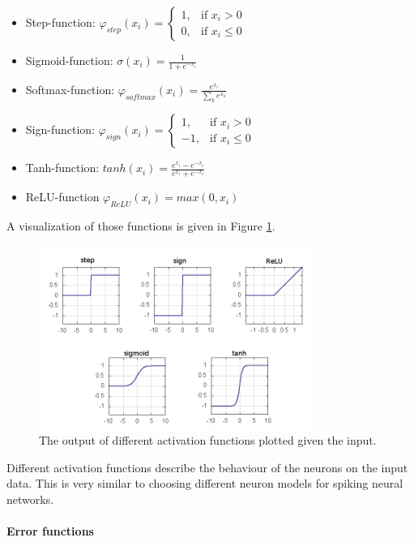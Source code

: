 \begin{itemize}
	\item Step-function: $\varphi_{step}(x_i) = \begin{cases} 1, & \text{if  } x_i > 0 \\ 0, & \text{if  } x_i \le 0  \end{cases}$
	\item Sigmoid-function: $\sigma(x_i) = \frac{1}{1 + e^{-x_i}}$ 
	\item Softmax-function: $\varphi_{softmax}(x_i) = \frac{e^{x_i}}{\sum_k e^{x_k}}$ 
	\item Sign-function: $\varphi_{sign}(x_i) = \begin{cases} 1, & \text{if  } x_i > 0 \\ -1, & \text{if  } x_i \le 0  \end{cases}$
	\item Tanh-function: $tanh(x_i) = \frac{e^{x_i} - e^{-x_i}}{e^{x_i} + e^{-x_i}}$
	\item ReLU-function $\varphi_{ReLU}(x_i) = max(0, x_i)$
\end{itemize}

A visualization of those functions is given in Figure \ref{fig:activations}.

\begin{figure}
	\centering
    	\includegraphics[width=0.8\textwidth]{imgs/act_fun.png} 
    \caption{The output of different activation functions plotted given the input.}
	\label{fig:activations}
\end{figure}

Different activation functions describe the behaviour of the neurons on the input data.
This is very similar to choosing different neuron models for spiking neural networks.


\paragraph{Error functions}

